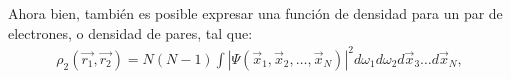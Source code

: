 %
%
%

Ahora bien, también es posible expresar una función de densidad para un par de
electrones, o densidad de pares, tal que:
%
\begin{align}
  \rho_2(\vec{r_1},\vec{r_2})=N(N-1)\int |\Psi (\vec{x}_1 ,  \vec{x}_2,  \ldots , \vec{x}_N)|^2
  d\omega_1 d\omega_2  d\vec{x}_3 \ldots d\vec{x}_N ,
\label{d_pares}
\end{align}

